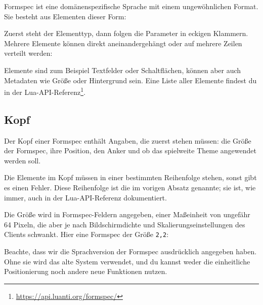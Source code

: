 Formspec ist eine domänenspezifische Sprache mit einem ungewöhnlichen
Format. Sie besteht aus Elementen dieser Form:

\begin{Shaded}
\begin{Highlighting}[]
\end{Highlighting}
\end{Shaded}

Zuerst steht der Elementtyp, dann folgen die Parameter in eckigen
Klammern. Mehrere Elemente können direkt aneinandergehängt oder auf
mehrere Zeilen verteilt werden:

\begin{Shaded}
\begin{Highlighting}[]
\end{Highlighting}
\end{Shaded}

Elemente sind zum Beispiel Textfelder oder Schaltflächen, können aber
auch Metadaten wie Größe oder Hintergrund
sein. Eine Liste aller Elemente findest du in der
Lua-API-Referenz\footnote{\url{https://api.luanti.org/formspec/}}.

\subsection{Kopf}\label{kopf}

Der Kopf einer Formspec enthält Angaben, die zuerst stehen müssen: die
Größe der Formspec, ihre Position, den Anker und ob das spielweite Theme
angewendet werden soll.

Die Elemente im Kopf müssen in einer bestimmten Reihenfolge stehen,
sonst gibt es einen Fehler. Diese Reihenfolge ist die im vorigen Absatz
genannte; sie ist, wie immer, auch in der Lua-API-Referenz dokumentiert.

Die Größe wird in Formspec-Feldern angegeben, einer Maßeinheit von
ungefähr 64 Pixeln, die aber je nach Bildschirmdichte und
Skalierungseinstellungen des Clients schwankt. Hier eine Formspec der
Größe \texttt{2,2}:

\begin{Shaded}
\begin{Highlighting}[]
\end{Highlighting}
\end{Shaded}

Beachte, dass wir die Sprachversion der Formspec ausdrücklich angegeben
haben. Ohne sie wird das alte System verwendet, und du kannst weder die
einheitliche Positionierung noch andere neue Funktionen nutzen.

